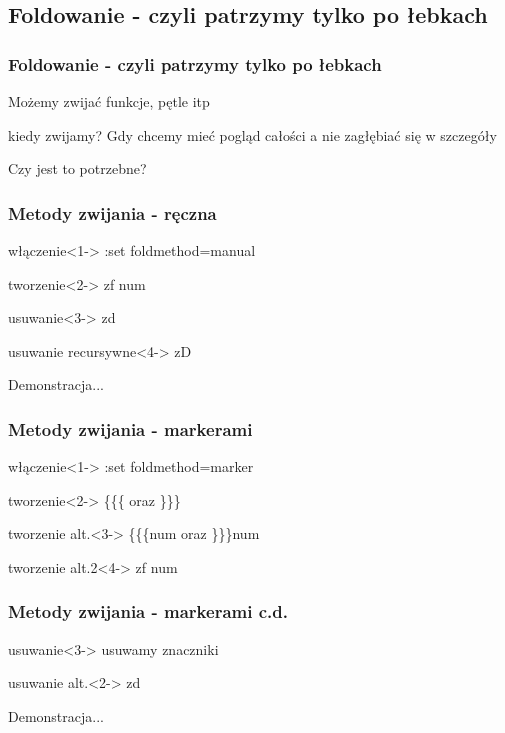 \documentclass{beamer}
\begin{document}
\subsection{Foldowanie - czyli patrzymy tylko po łebkach}
\begin{frame}
	\frametitle{Foldowanie - czyli patrzymy tylko po łebkach}
	{
		Możemy zwijać funkcje, pętle itp\\
	}
	\uncover<2->
	{
		\begin{block}{kiedy zwijamy?}
			Gdy chcemy mieć pogląd całości a nie zagłębiać się w szczegóły
		\end{block}
	}
	{
		Czy jest to potrzebne?
	}
\end{frame}
\begin{frame}
	\frametitle{Metody zwijania - ręczna}
	\begin{block}{włączenie}<1->
	:set foldmethod=manual
	\end{block}
	\begin{block}{tworzenie}<2->
	zf num
	\end{block}
	\begin{block}{usuwanie}<3->
	zd
	\end{block}
	\begin{block}{usuwanie recursywne}<4->
	zD
	\end{block}
	{
		Demonstracja...
	}
\end{frame}
\begin{frame}
	\frametitle{Metody zwijania - markerami}
	\begin{block}{włączenie}<1->
	:set foldmethod=marker
	\end{block}
	\begin{block}{tworzenie}<2->
	\{\{\{ oraz \}\}\}
	\end{block}
	\begin{block}{tworzenie alt.}<3->
	\{\{\{num oraz \}\}\}num
	\end{block}
	\begin{block}{tworzenie alt.2}<4->
	zf num
	\end{block}
\end{frame}
\begin{frame}
	\frametitle{Metody zwijania - markerami c.d.}
	\begin{block}{usuwanie}<3->
	usuwamy znaczniki
	\end{block}
	\begin{block}{usuwanie alt.}<2->
	zd
	\end{block}
	{
		Demonstracja...
	}
\end{frame}
\end{document}
